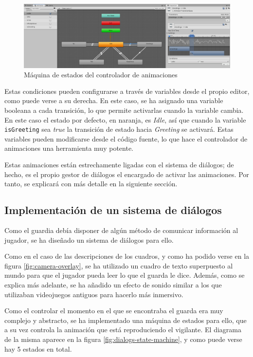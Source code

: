 \begin{figure}[!h]
\begin{center}
\includegraphics[width=1\textwidth]{imagenes/7/animator.png}
\caption{Máquina de estados del controlador de animaciones}
\label{fig:animator}
\end{center}
\end{figure}

Estas condiciones pueden configurarse a través de variables desde el propio editor, como puede verse a su derecha. En este caso, se ha asignado una variable booleana a cada transición, lo que permite activarlas cuando la variable cambia. En este caso el estado por defecto, en naranja, es \textit{Idle}, así que cuando la variable \texttt{isGreeting} sea \textit{true} la transición de estado hacia \textit{Greeting} se activará. Estas variables pueden modificarse desde el código fuente, lo que hace el controlador de animaciones una herramienta muy potente.

Estas animaciones están estrechamente ligadas con el sistema de diálogos; de hecho, es el propio gestor de diálogos el encargado de activar las animaciones. Por tanto, se explicará con más detalle en la siguiente sección.

\subsection{Implementación de un sistema de diálogos}

Como el guardia debía disponer de algún método de comunicar información al jugador, se ha diseñado un sistema de diálogos para ello. 

Como en el caso de las descripciones de los cuadros, y como ha podido verse en la figura \ref{fig:camera-overlay}, se ha utilizado un cuadro de texto superpuesto al mundo para que el jugador pueda leer lo que el guarda le dice. Además, como se explica más adelante, se ha añadido un efecto de sonido similar a los que utilizaban videojuegos antiguos para hacerlo más inmersivo.

Como el controlar el momento en el que se encontraba el guarda era muy complejo y abstracto, se ha implementado una máquina de estados para ello, que a su vez controla la animación que está reproduciendo el vigilante. El diagrama de la misma aparece en la figura \ref{fig:dialogs-state-machine}, y como puede verse hay 5 estados en total.

